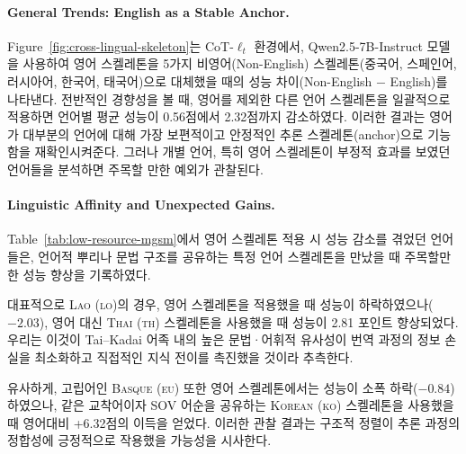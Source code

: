 \paragraph{General Trends: English as a Stable Anchor.}
Figure~\ref{fig:cross-lingual-skeleton}는 CoT-$\ell_t$ 환경에서, Qwen2.5-7B-Instruct 모델을 사용하여 영어 스켈레톤을 5가지 비영어(Non-English) 스켈레톤(중국어, 스페인어, 러시아어, 한국어, 태국어)으로 대체했을 때의 성능 차이(Non-English $-$ English)를 나타낸다. 전반적인 경향성을 볼 때, 영어를 제외한 다른 언어 스켈레톤을 일괄적으로 적용하면 언어별 평균 성능이 0.56점에서 2.32점까지 감소하였다. 이러한 결과는 영어가 대부분의 언어에 대해 가장 보편적이고 안정적인 추론 스켈레톤(anchor)으로 기능함을 재확인시켜준다. 그러나 개별 언어, 특히 영어 스켈레톤이 부정적 효과를 보였던 언어들을 분석하면 주목할 만한 예외가 관찰된다.

\paragraph{Linguistic Affinity and Unexpected Gains.}
Table~\ref{tab:low-resource-mgsm}에서 영어 스켈레톤 적용 시 성능 감소를 겪었던 언어들은, 언어적 뿌리나 문법 구조를 공유하는 특정 언어 스켈레톤을 만났을 때 주목할만한 성능 향상을 기록하였다.

대표적으로 \textsc{Lao (lo)}의 경우, 영어 스켈레톤을 적용했을 때 성능이 하락하였으나($-2.03$), 영어 대신 \textsc{Thai (th)} 스켈레톤을 사용했을 때 성능이 2.81 포인트 향상되었다. 우리는 이것이 Tai--Kadai 어족 내의 높은 문법·어휘적 유사성이 번역 과정의 정보 손실을 최소화하고 직접적인 지식 전이를 촉진했을 것이라 추측한다. 

유사하게, 고립어인 \textsc{Basque (eu)} 또한 영어 스켈레톤에서는 성능이 소폭 하락($-0.84$)하였으나, 같은 교착어이자 SOV 어순을 공유하는 \textsc{Korean (ko)} 스켈레톤을 사용했을 때 영어대비 +6.32점의 이득을 얻었다. 이러한 관찰 결과는 구조적 정렬이 추론 과정의 정합성에 긍정적으로 작용했을 가능성을 시사한다.


